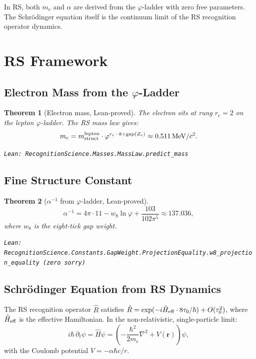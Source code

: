 \documentclass[12pt,a4paper]{article}
\newtheorem{theorem}{Theorem}[section]
\theoremstyle{definition}
\theoremstyle{remark}
\begin{document}
In RS, both $m_e$ and $\alpha$ are derived from the $\varphi$-ladder with
zero free parameters.  The Schr\"{o}dinger equation itself is the
continuum limit of the RS recognition operator dynamics.

\section{RS Framework}

\subsection{Electron Mass from the $\varphi$-Ladder}

\begin{theorem}[Electron mass, Lean-proved]\label{thm:me}
The electron sits at rung $r_e = 2$ on the lepton $\varphi$-ladder.
The RS mass law gives:
\begin{equation}
  m_e = m_{\rm struct}^{\rm lepton} \cdot \varphi^{r_e - 8 + {\rm gap}(Z_e)}
  \approx 0.511\,\text{MeV}/c^2.
\end{equation}

\texttt{Lean: RecognitionScience.Masses.MassLaw.predict\_mass}
\end{theorem}

\subsection{Fine Structure Constant}

\begin{theorem}[$\alpha^{-1}$ from $\varphi$-ladder, Lean-proved]\label{thm:alpha}
\begin{equation}
  \alpha^{-1} = 4\pi \cdot 11 - w_8 \ln\varphi + \frac{103}{102\pi^5}
  \approx 137.036,
\end{equation}
where $w_8$ is the eight-tick gap weight.

\texttt{Lean: RecognitionScience.Constants.GapWeight.ProjectionEquality.w8\_projection\_equality (zero sorry)}
\end{theorem}

\subsection{Schr\"{o}dinger Equation from RS Dynamics}

The RS recognition operator $\hat{R}$ satisfies
$\hat{R} = \exp(-i\hat{H}_{\rm eff}\cdot 8\tau_0/\hbar) + O(\tau_0^2)$,
where $\hat{H}_{\rm eff}$ is the effective Hamiltonian.  In the
non-relativistic, single-particle limit:
\begin{equation}
  i\hbar\,\partial_t\psi = \hat{H}\psi
  = \left(-\frac{\hbar^2}{2m_e}\nabla^2 + V(\mathbf{r})\right)\psi,
  \label{eq:schrodinger}
\end{equation}
with the Coulomb potential $V = -\alpha\hbar c/r$.
\end{document}
